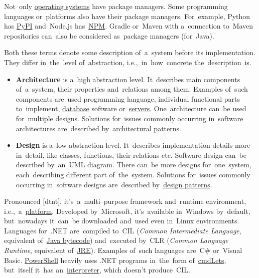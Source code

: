Not~only \hyperref[os]{operating systems} have package managers.
Some programming languages or~platforms also have their package managers.
For~example, Python has \href{https://pypi.org/}{PyPI} and~Node.js has~\hyperref[npm]{NPM}.
Gradle or~Maven with a~connection to~Maven repositories can~also be considered as~package managers (for~Java).
\newpage

\label{architecturedesign}
Both these terms denote some description of~a~system before its implementation.
They differ in~the~level of~abstraction, i.e.,~in~how~concrete the~description~is.
\begin{itemize}
    \item \textbf{Architecture} is a~high abstraction level.
          It~describes main components of~a~system, their properties and~relations among them.
          Examples of~such components are~used programming language, individual functional parts to~implement, \hyperref[databases]{database} software or~\hyperref[server]{servers}.
          One~architecture can~be used for~multiple designs.
          Solutions for~issues commonly occurring in~software architectures are~described by~\hyperref[architecturalpatterns]{architectural patterns}.
    \item \textbf{Design} is a~low abstraction level.
          It~describes implementation details more in~detail, like classes, functions, their relations etc.
          Software design can~be described by~an~UML diagram.
          There can~be more designs for~one~system, each~describing different part of~the~system.
          Solutions for~issues commonly occurring in~software designs are~described by~\hyperref[designpatterns]{design patterns}.
\end{itemize}

\label{dotnet}
Pronounced [d\textopeno{}tn\textepsilon{}t], it's~a~multi--purpose framework and~runtime environment, i.e.,~a~\hyperref[platform]{platform}.
Developed by~Microsoft, it's~available in~Windows by~default, but~nowadays it~can~be downloaded and~used even in~Linux environments.
Languages \mbox{for~.NET} are~compiled to~CIL (\textit{Common Intermediate Language}, equivalent of~\hyperref[bytecode]{Java bytecode}) and~executed by~CLR (\textit{Common Language Runtime}, equivalent of~\hyperref[jdkjrejvm]{JRE}).
Examples of~such languages are~C\# or~Visual Basic.
\hyperref[powershell]{PowerShell} heavily uses .NET programs in~the~form of~\hyperref[cmdlet]{cmdLets}, but~itself it~has an~\hyperref[compiledinterpretedlanguages]{interpreter}, which doesn't produce~CIL.

